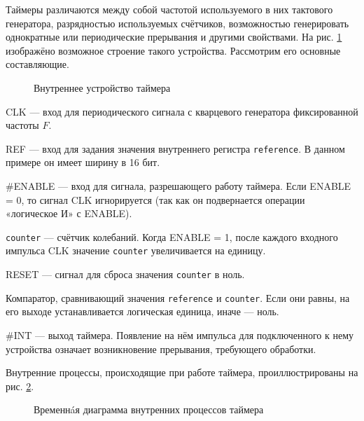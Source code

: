 Таймеры различаются между собой частотой используемого в них тактового генератора, разрядностью используемых счётчиков, возможностью генерировать однократные или периодические прерывания и другими свойствами.
На рис. \ref{fig:periodic-timer} изображёно возможное строение такого устройства. Рассмотрим его основные составляющие.

\begin{figure}[htp]
    \centering
    \caption[Внутреннее устройство таймера]{Внутреннее устройство таймера}
    \label{fig:periodic-timer}
\end{figure}

\begin{itemize*}
    \item CLK — вход для периодического сигнала с кварцевого генератора фиксированной частоты $F$. %
    \item REF — вход для задания значения внутреннего регистра \texttt{reference}. В данном примере он имеет ширину в 16 бит.
    \item \#ENABLE — вход для сигнала, разрешающего работу таймера. Если ENABLE = 0, то сигнал CLK игнорируется (так как он подвернается операции «логическое И» с ENABLE).
    \item \texttt{counter} — счётчик колебаний. Когда ENABLE = 1, после каждого входного импульса CLK значение \texttt{counter} увеличивается на единицу.
    \item RESET — сигнал для сброса значения \texttt{counter} в ноль.
    \item Компаратор, сравнивающий значения \texttt{reference} и \texttt{counter}. Если они равны, на его выходе устанавливается логическая единица, иначе — ноль.
    \item \#INT — выход таймера. Появление на нём импульса для подключенного к нему устройства означает возникновение прерывания, требующего обработки.
\end{itemize*}

Внутренние процессы, происходящие при работе таймера, проиллюстрированы на рис. \ref{fig:counter-diagram}.

\begin{figure}[htp]
    \centering
    \caption[Временнáя диаграмма внутренних процессов]{Временнáя диаграмма внутренних процессов таймера}
    \label{fig:counter-diagram}
\end{figure}


